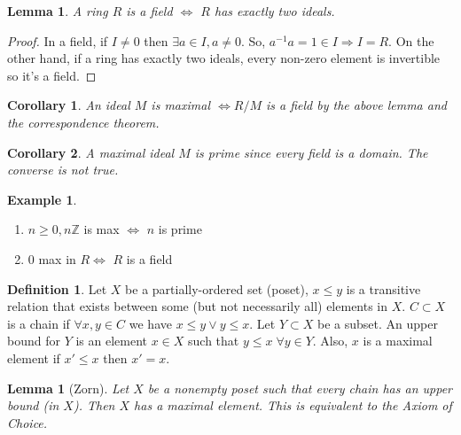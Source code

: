 \documentclass{article}
\newcommand\Z{\ensuremath{\mathbb{Z}}}
\newtheorem{corollary}{Corollary}[theorem]
\newtheorem{lemma}[theorem]{Lemma}
\theoremstyle{definition}
\newtheorem{definition}{Definition}[subsection]
\newtheorem{eg}{Example}[subsection]
\theoremstyle{remark}
\theoremstyle{plain}
\begin{document}
    \begin{lemma}
        A ring \(R\) is a field \(\iff\) \(R\) has exactly two ideals.
    \end{lemma}
    \begin{proof}
        In a field, if \(I \neq 0\) then \(\exists a\in I, a \neq 0\). So, \(a^{-1}a = 1 \in I \Rightarrow I = R\). On the other hand, if a ring has exactly two ideals, every non-zero element is invertible so it's a field. 
    \end{proof}

    \begin{corollary}
        An ideal \(M\) is maximal \(\iff R/M\) is a field by the above lemma and the correspondence theorem. 
    \end{corollary}

    \begin{corollary}
        A maximal ideal \(M\) is prime since every field is a domain. The converse is not true. 
    \end{corollary}

    \begin{eg}
        \begin{enumerate}
            \item \(n \geq 0, n\Z\) is max \(\iff\) \(n\) is prime
            \item \(0\) max in \(R \iff\) \(R\) is a field
        \end{enumerate}
    \end{eg}

    \begin{definition}
        Let \(X\) be a partially-ordered set (poset), \(x \leq y\) is a transitive relation that exists 
        between some (but not necessarily all) elements in \(X\). \(C \subset X\) is a chain if \(\forall x,y \in C\)
        we have \(x \leq y \lor y \leq x\). Let \(Y \subset X\) be a subset. An upper bound for \(Y\) is an element 
        \(x \in X\) such that \(y \leq x \; \forall y \in Y\). Also, \(x\) is a maximal element if \(x' \leq x\) then \(x' = x\).
    \end{definition}
    \begin{lemma}[Zorn]
        Let \(X\) be a nonempty poset such that every chain has an upper bound (in \(X\)). Then \(X\) has a maximal element. 
        This is equivalent to the Axiom of Choice. 
    \end{lemma}
\end{document}
